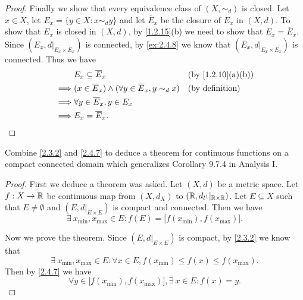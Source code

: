 \begin{proof}
  Finally we show that every equivalence class of \((X, \sim_d)\) is closed.
  Let \(x \in X\), let \(E_x = \{y \in X : x \sim_d y\}\) and let \(\overline{E}_x\) be the closure of \(E_x\) in \((X, d)\).
  To show that \(E_x\) is closed in \((X, d)\), by \cref{1.2.15}(b) we need to show that \(E_x = \overline{E}_x\).
  Since \((E_x, d|_{E_x \times E_x})\) is connected, by \cref{ex:2.4.8} we know that \((\overline{E}_x, d|_{\overline{E}_x \times \overline{E}_x})\) is connected.
  Thus we have
  \begin{align*}
             & E_x \subseteq \overline{E}_x                                            &  & \text{(by \cref{1.2.10}(a)(b))} \\
    \implies & (x \in \overline{E}_x) \land (\forall y \in \overline{E}_x, y \sim_d x) &  & \text{(by definition)}          \\
    \implies & \forall y \in \overline{E}_x, y \in E_x                                                                      \\
    \implies & E_x = \overline{E}_x.
  \end{align*}
\end{proof}

\begin{ex}\label{ex:2.4.10}
  Combine \cref{2.3.2} and \cref{2.4.7} to deduce a theorem for continuous functions on a compact connected domain which generalizes Corollary 9.7.4 in Analysis I.
\end{ex}

\begin{proof}
  First we deduce a theorem was asked.
  Let \((X, d)\) be a metric space.
  Let \(f : X \to \mathbb{R}\) be continuous map from \((X, d_X)\) to \((\mathbb{R}, d_{l^1}|_{\mathbb{R} \times \mathbb{R}})\).
  Let \(E \subseteq X\) such that \(E \neq \emptyset\) and \((E, d|_{E \times E})\) is compact and connected.
  Then we have
  \[
    \exists\ x_{\min}, x_{\max} \in E : f(E) = \big[f(x_{\min}), f(x_{\max})\big].
  \]

  Now we prove the theorem.
  Since \((E, d|_{E \times E})\) is compact, by \cref{2.3.2} we know that
  \[
    \exists\ x_{\min}, x_{\max} \in E : \forall x \in E, f(x_{\min}) \leq f(x) \leq f(x_{\max}).
  \]
  Then by \cref{2.4.7} we have
  \[
    \forall y \in \big[f(x_{\min}), f(x_{\max})\big], \exists\ x \in E : f(x) = y.
  \]
\end{proof}